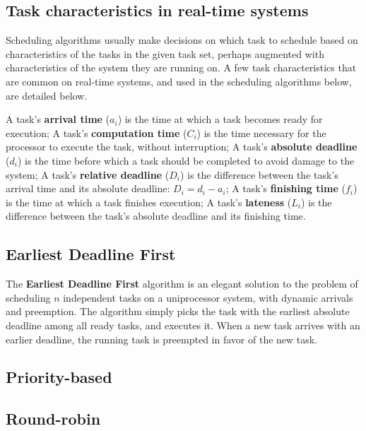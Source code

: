 \documentclass[twoside]{uva-inf-bachelor-thesis}
\begin{document}
\subsection{Task characteristics in real-time systems}
Scheduling algorithms usually make decisions on which task to schedule based on characteristics of the tasks in the given task set, perhaps augmented with characteristics of the system they are running on. A few task characteristics that are common on real-time systems, and used in the scheduling algorithms below, are detailed below.

\begin{outline}
    \1 A task's \textbf{arrival time} ($a_i$) is the time at which a task becomes ready for execution;
    \1 A task's \textbf{computation time} ($C_i$) is the time necessary for the processor to execute the task, without interruption;
    \1 A task's \textbf{absolute deadline} ($d_i$) is the time before which a task should be completed to avoid damage to the system;
    \1 A task's \textbf{relative deadline} ($D_i$) is the difference between the task's arrival time and its absolute deadline: $D_i = d_i - a_i$;
    \1 A task's \textbf{finishing time} ($f_i$) is the time at which a task finishes execution;
    \1 A task's \textbf{lateness} ($L_i$) is the difference between the task's absolute deadline and its finishing time.
\end{outline}

\subsection{Earliest Deadline First}
The \textbf{Earliest Deadline First} algorithm is an elegant solution to the problem of scheduling $n$ independent tasks on a uniprocessor system, with dynamic arrivals and preemption. The algorithm simply picks the task with the earliest absolute deadline among all ready tasks, and executes it. When a new task arrives with an earlier deadline, the running task is preempted in favor of the new task.



\subsection{Priority-based}

\subsection{Round-robin}
\end{document}
